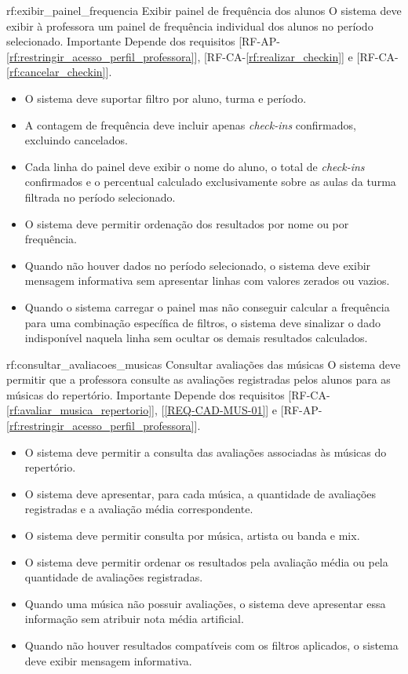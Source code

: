 \reqfuncfull
{rf:exibir_painel_frequencia}
{Exibir painel de frequência dos alunos}
{O sistema deve exibir à professora um painel de frequência individual dos alunos no período selecionado.}
{Importante}
{Depende dos requisitos [RF-AP-\ref{rf:restringir_acesso_perfil_professora}], [RF-CA-\ref{rf:realizar_checkin}] e [RF-CA-\ref{rf:cancelar_checkin}].}
{\begin{itemize}[leftmargin=0.6cm]
    \item O sistema deve suportar filtro por aluno, turma e período.
    \item A contagem de frequência deve incluir apenas \textit{check-ins} confirmados, excluindo cancelados.
    \item Cada linha do painel deve exibir o nome do aluno, o total de \textit{check-ins} confirmados e o percentual calculado exclusivamente sobre as aulas da turma filtrada no período selecionado.
    \item O sistema deve permitir ordenação dos resultados por nome ou por frequência.
    \item Quando não houver dados no período selecionado, o sistema deve exibir mensagem informativa sem apresentar linhas com valores zerados ou vazios.
    \item Quando o sistema carregar o painel mas não conseguir calcular a frequência para uma combinação específica de filtros, o sistema deve sinalizar o dado indisponível naquela linha sem ocultar os demais resultados calculados.
\end{itemize}}

\reqfuncfull
{rf:consultar_avaliacoes_musicas}
{Consultar avaliações das músicas}
{O sistema deve permitir que a professora consulte as avaliações registradas pelos alunos para as músicas do repertório.}
{Importante}
{Depende dos requisitos [RF-CA-\ref{rf:avaliar_musica_repertorio}], [\ref{REQ-CAD-MUS-01}] e [RF-AP-\ref{rf:restringir_acesso_perfil_professora}].}
{\begin{itemize}[leftmargin=0.6cm]
    \item O sistema deve permitir a consulta das avaliações associadas às músicas do repertório.
    \item O sistema deve apresentar, para cada música, a quantidade de avaliações registradas e a avaliação média correspondente.
    \item O sistema deve permitir consulta por música, artista ou banda e mix.
    \item O sistema deve permitir ordenar os resultados pela avaliação média ou pela quantidade de avaliações registradas.
    \item Quando uma música não possuir avaliações, o sistema deve apresentar essa informação sem atribuir nota média artificial.
    \item Quando não houver resultados compatíveis com os filtros aplicados, o sistema deve exibir mensagem informativa.
\end{itemize}}

